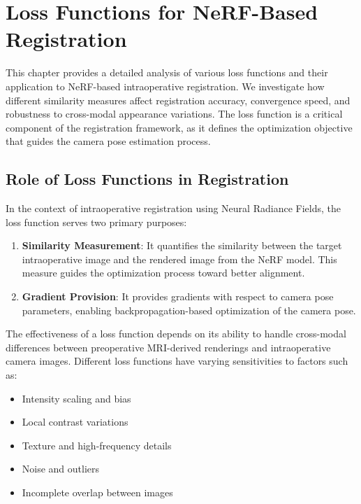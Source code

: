 
\chapter{Loss Functions for NeRF-Based Registration}\label{chapter:loss_functions}

This chapter provides a detailed analysis of various loss functions and their application to NeRF-based intraoperative registration. We investigate how different similarity measures affect registration accuracy, convergence speed, and robustness to cross-modal appearance variations. The loss function is a critical component of the registration framework, as it defines the optimization objective that guides the camera pose estimation process.

\section{Role of Loss Functions in Registration}

In the context of intraoperative registration using Neural Radiance Fields, the loss function serves two primary purposes:

\begin{enumerate}
    \item \textbf{Similarity Measurement}: It quantifies the similarity between the target intraoperative image and the rendered image from the NeRF model. This measure guides the optimization process toward better alignment.
    
    \item \textbf{Gradient Provision}: It provides gradients with respect to camera pose parameters, enabling backpropagation-based optimization of the camera pose.
\end{enumerate}

The effectiveness of a loss function depends on its ability to handle cross-modal differences between preoperative MRI-derived renderings and intraoperative camera images. Different loss functions have varying sensitivities to factors such as:

\begin{itemize}
    \item Intensity scaling and bias
    \item Local contrast variations
    \item Texture and high-frequency details
    \item Noise and outliers
    \item Incomplete overlap between images
\end{itemize}

